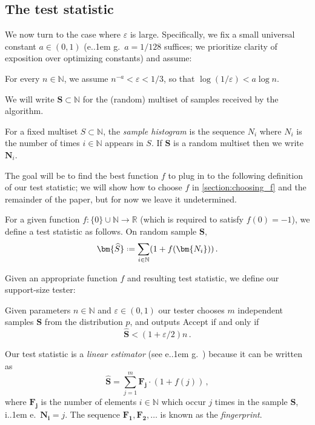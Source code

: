 \documentclass{theoretics}
\newcommand*\ie{i.\kern.1em e.\ }
\newcommand*\eg{e.\kern.1em g.\ }
\newcommand*{\define}{\mathrel{\vcenter{\baselineskip0.5ex \lineskiplimit0pt
                      \hbox{\scriptsize.}\hbox{\scriptsize.}}}%
                      =}
\newcommand{\bN}{\ensuremath{\mathbb{N}}}
\newcommand{\bR}{\ensuremath{\mathbb{R}}}
\renewcommand{\epsilon}{\varepsilon}
\begin{document}
\subsection{The test statistic}

We now turn to the case where $\epsilon$ is large. Specifically, we fix a small universal constant
$a \in (0,1)$ (\eg $a = 1/128$ suffices; we prioritize clarity of exposition over optimizing
constants) and assume:

\begin{assumption}
\label{assumption:epsilon}
For every $n \in \bN$, we assume $n^{-a} < \epsilon < 1/3$,
so that $\log(1/\epsilon) < a \log n$.
\end{assumption}

We will write $\bm{S} \subset \bN$ for the (random) multiset of samples received by the algorithm.

\begin{definition}
For a fixed multiset $S \subset \bN$, the \emph{sample histogram} is the sequence $N_i$ where $N_i$
is the number of times $i \in \bN$ appears in $S$. If $\bm S$ is a random multiset then we write
$\bm{N}_i$.
\end{definition}

The goal will be to find the best function $f$ to plug in to the following definition of our test
statistic; we will show how to choose $f$ in \cref{section:choosing_f} and the remainder of the
paper, but for now we leave it undetermined.

\begin{definition}
\label{def:test-statistic}
For a given function $f : \{0\} \cup \bN \to \bR$ (which is required to satisfy $f(0) = -1$),
we define a test statistic as follows. On random sample $\bm S$,
\[
    \bm{\widehat S} \define \sum_{i \in \bN} (1 + f(\bm{N_i}) ) \,.
\]
\end{definition}

Given an appropriate function $f$ and resulting test statistic, we define our support-size tester:

\begin{definition}
\label{def:tester}
Given parameters $n \in \bN$ and $\epsilon \in (0,1)$ our tester chooses $m$ independent samples
$\bm{S}$ from the distribution $p$, and outputs \textsf{Accept} if and only if
\[
  \bm{\widehat S} < (1 + \epsilon/2) n \,.
\]
\end{definition}

\begin{remark}
Our test statistic is a \emph{linear estimator} (see \eg \cite{VV11stoc,VV11focs,VV17,WY19}) because
it can be written as
\[
  \widehat{\bm S} = \sum_{j=1}^m \bm{F_j} \cdot (1+f(j)) \,,
\]
where $\bm{F_j}$ is the number of elements $i \in \bN$ which occur $j$ times in the sample $\bm{S}$,
\ie $\bm{N_i} = j$. The sequence $\bm{F_1}, \bm{F_2}, \dotsc$ is known as the \emph{fingerprint}.
\end{remark}
\end{document}
